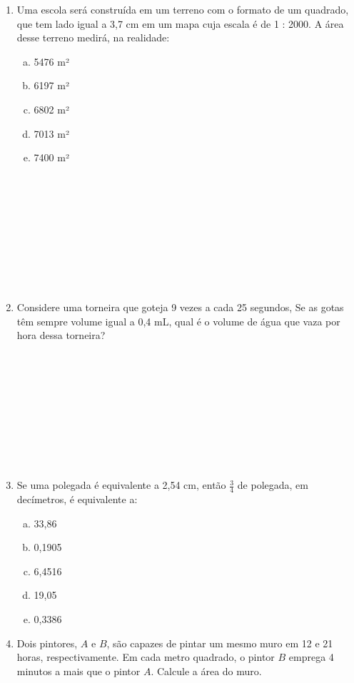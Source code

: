 \documentclass[a4paper,14pt]{article}
\begin{document}
\begin{multicols}{2}
\begin{enumerate}
    	    \item Uma escola será construída em um terreno com o formato de um quadrado, que tem lado igual a 3,7 cm em um mapa cuja escala é de 1 : 2000. A área desse terreno medirá, na realidade:
    	    \begin{enumerate}[a)]
    	    	\item 5476 m²
    	    	\item 6197 m²
    	    	\item 6802 m²
    	    	\item 7013 m²
    	    	\item 7400 m² \\\\\\\\\\\\\\\\\\\\
    	    \end{enumerate}
            \item Considere uma torneira que goteja 9 vezes a cada 25 segundos, Se as gotas têm sempre volume igual a 0,4 mL, qual é o volume de água que vaza por hora dessa torneira? \\\\\\\\\\\\\\\\\\\\
            \item Se uma polegada é equivalente a 2,54 cm, então $\frac{3}{4}$ de polegada, em decímetros, é equivalente a:
            \begin{enumerate}[a)]
            	\item 33,86
            	\item 0,1905
            	\item 6,4516
            	\item 19,05
            	\item 0,3386 \\
            \end{enumerate}
            \item Dois pintores, $A$ e $B$, são capazes de pintar um mesmo muro em 12 e 21 horas, respectivamente. Em cada metro quadrado, o pintor $B$ emprega 4 minutos a mais que o pintor $A$. Calcule a área do muro. \\\\\\\\\\\\\\\\\\\\

\end{enumerate}
\end{multicols}
\end{document}
